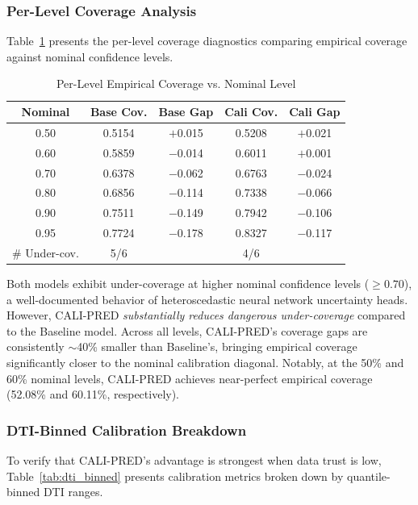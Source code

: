 \documentclass[journal]{IEEEtran}
\begin{document}
\subsubsection{Per-Level Coverage Analysis}
Table~\ref{tab:coverage} presents the per-level coverage diagnostics comparing empirical coverage against nominal confidence levels.

\begin{table}[htbp]
\centering
\caption{Per-Level Empirical Coverage vs. Nominal Level}
\label{tab:coverage}
\begin{tabular}{ccccc}
\toprule
Nominal & Base Cov. & Base Gap & Cali Cov. & Cali Gap \\
\midrule
0.50 & 0.5154 & $+$0.015 & 0.5208 & $+$0.021 \\
0.60 & 0.5859 & $-$0.014 & 0.6011 & $+$0.001 \\
0.70 & 0.6378 & $-$0.062 & 0.6763 & $-$0.024 \\
0.80 & 0.6856 & $-$0.114 & 0.7338 & $-$0.066 \\
0.90 & 0.7511 & $-$0.149 & 0.7942 & $-$0.106 \\
0.95 & 0.7724 & $-$0.178 & 0.8327 & $-$0.117 \\
\midrule
\# Under-cov. & 5/6 & & 4/6 & \\
\bottomrule
\end{tabular}
\end{table}

Both models exhibit under-coverage at higher nominal confidence levels ($\ge 0.70$), a well-documented behavior of heteroscedastic neural network uncertainty heads. However, CALI-PRED \emph{substantially reduces dangerous under-coverage} compared to the Baseline model. Across all levels, CALI-PRED's coverage gaps are consistently $\sim$40\% smaller than Baseline's, bringing empirical coverage significantly closer to the nominal calibration diagonal. Notably, at the 50\% and 60\% nominal levels, CALI-PRED achieves near-perfect empirical coverage (52.08\% and 60.11\%, respectively).

\subsubsection{DTI-Binned Calibration Breakdown}
To verify that CALI-PRED's advantage is strongest when data trust is low, Table~\ref{tab:dti_binned} presents calibration metrics broken down by quantile-binned DTI ranges.
\end{document}
